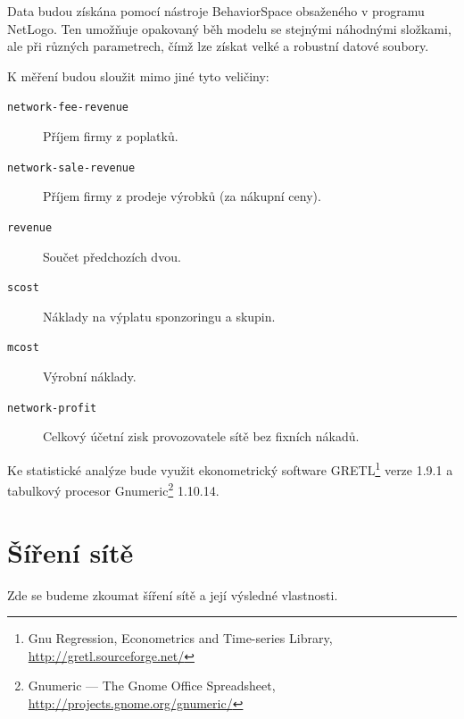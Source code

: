 \documentclass[a4wide,12pt]{report}
\begin{document}
Data budou získána pomocí nástroje BehaviorSpace obsaženého v programu NetLogo. Ten umožňuje opakovaný běh modelu se stejnými náhodnými složkami, ale při různých parametrech, čímž lze získat velké a robustní datové soubory.

K měření budou sloužit mimo jiné tyto veličiny:
\begin{description}
\item[\texttt{network-fee-revenue}] Příjem firmy z poplatků.
\item[\texttt{network-sale-revenue}] Příjem firmy z prodeje výrobků (za nákupní ceny).
\item[\texttt{revenue}] Součet předchozích dvou.
\item[\texttt{scost}] Náklady na výplatu sponzoringu a skupin.
\item[\texttt{mcost}] Výrobní náklady.
\item[\texttt{network-profit}] Celkový účetní zisk provozovatele sítě bez fixních nákadů. 
\end{description}
Ke statistické analýze bude využit ekonometrický software GRETL\footnote{Gnu Regression, Econometrics and Time-series Library, \url{http://gretl.sourceforge.net/}} verze 1.9.1 a tabulkový procesor Gnumeric\footnote{Gnumeric --- The Gnome Office Spreadsheet, \url{http://projects.gnome.org/gnumeric/}} 1.10.14.
\section{Šíření sítě}
Zde se budeme zkoumat šíření sítě a její výsledné vlastnosti. 
\end{document}
